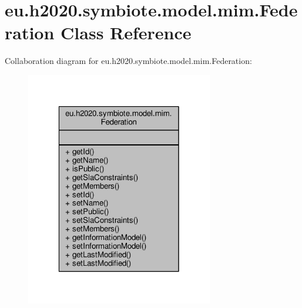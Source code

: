\hypertarget{classeu_1_1h2020_1_1symbiote_1_1model_1_1mim_1_1Federation}{}\section{eu.\+h2020.\+symbiote.\+model.\+mim.\+Federation Class Reference}
\label{classeu_1_1h2020_1_1symbiote_1_1model_1_1mim_1_1Federation}


Collaboration diagram for eu.\+h2020.\+symbiote.\+model.\+mim.\+Federation\+:
\nopagebreak
\begin{figure}[H]
\begin{center}
\leavevmode
\includegraphics[width=232pt]{classeu_1_1h2020_1_1symbiote_1_1model_1_1mim_1_1Federation__coll__graph}
\end{center}
\end{figure}
